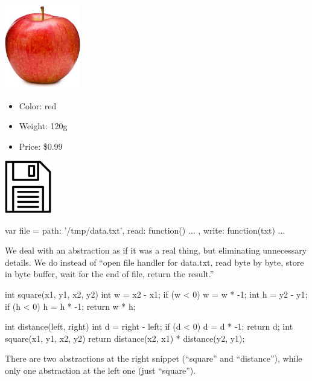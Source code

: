 \documentclass{article}
\begin{document}
\begin{pptWide}{2}
\includegraphics[width=1.3in]{apple.jpg}
\begin{itemize}
\item Color: red
\item Weight: 120g
\item Price: \$0.99
\end{itemize}
\par\columnbreak\par
\includegraphics[width=0.8in]{file-on-disc.jpg}
\par
{\small\begin{ffcode}
var file = {
  path: '/tmp/data.txt',
  read: function() { ... },
  write: function(txt) { ... }
}
\end{ffcode}
}
\end{pptWide}
We deal with an abstraction as if it was a real thing, but eliminating unnecessary details.
We do  instead of ``open file handler for data.txt, read byte by byte, store in
byte buffer, wait for the end of file, return the result.''
\plush{}

\begin{pptWide}{2}
{\small\begin{ffcode}
int square(x1, y1, x2, y2) {
  int w = x2 - x1;
  if (w < 0) { w = w * -1; }
  int h = y2 - y1;
  if (h < 0) { h = h * -1; }
  return w * h;
}
\end{ffcode}
}
\par\columnbreak\par
{\small\begin{ffcode}
int distance(left, right) {
  int d = right - left;
  if (d < 0) { d = d * -1; }
  return d;
}
int square(x1, y1, x2, y2) {
  return distance(x2, x1)
    * distance(y2, y1);
}
\end{ffcode}
}
\end{pptWide}\par
There are two abstractions at the right snippet (``square'' and ``distance''), while only one abstraction at the left one (just ``square'').
\plush{}
\end{document}
